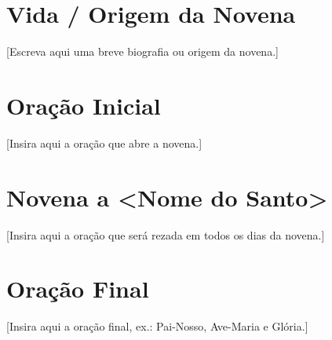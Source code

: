 \documentclass[18pt]{article}
\author{Adaptado de publicação revisada}
\date{} %
\begin{document}
\tableofcontents
\thispagestyle{empty}

\newpage
\section{Vida / Origem da Novena}
\begin{justify}
  [Escreva aqui uma breve biografia ou origem da novena.]
\end{justify}

\newpage
\section{Oração Inicial}
\begin{justify}
  [Insira aqui a oração que abre a novena.]
\end{justify}

\newpage
\section{Novena a \textbf{<Nome do Santo>}}
\begin{justify}
  [Insira aqui a oração que será rezada em todos os dias da novena.]

\end{justify}

\newpage
\section*{Oração Final}
\begin{justify}
  [Insira aqui a oração final, ex.: Pai-Nosso, Ave-Maria e Glória.]
\end{justify}
\end{document}
